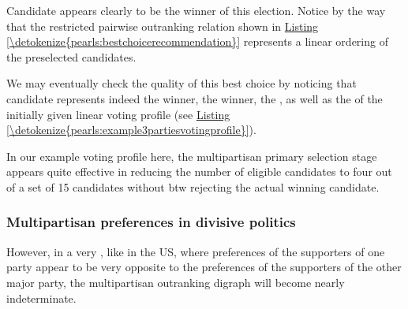 \documentclass[a4paper,12pt,english]{sphinxhowto}
\begin{document}
\sphinxAtStartPar
Candidate  appears clearly to be the winner of this election. Notice by the way that the restricted pairwise outranking relation shown in \hyperref[\detokenize{pearls:bestchoicerecommendation}]{Listing \ref{\detokenize{pearls:bestchoicerecommendation}}} represents a linear ordering of the preselected candidates.

\sphinxAtStartPar
We may eventually check the quality of this best choice by noticing that candidate  represents indeed the  winner, the  winner, the , as well as the  of the initially given linear voting profile  (see \hyperref[\detokenize{pearls:example3partiesvotingprofile}]{Listing \ref{\detokenize{pearls:example3partiesvotingprofile}}}).
\def\sphinxLiteralBlockLabel{\label{\detokenize{pearls:verificationbestchoice}}}
\begin{sphinxVerbatim}[commandchars=\\\{\},numbers=left,firstnumber=1,stepnumber=1]
 
  
\end{sphinxVerbatim}

\sphinxAtStartPar
In our example voting profile here, the multipartisan primary selection stage appears quite effective in reducing the number of eligible candidates to four out of a set of 15 candidates without btw rejecting the actual winning candidate.


\subsubsection{Multipartisan preferences in divisive politics}
\label{\detokenize{pearls:multipartisan-preferences-in-divisive-politics}}
\sphinxAtStartPar
However, in a very , like in the US, where preferences of the supporters of one party appear to be very opposite to the preferences of the supporters of the other major party, the multipartisan outranking digraph will become nearly indeterminate.
\end{document}
